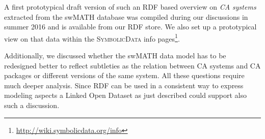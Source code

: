\documentclass{mathincs}
\newcommand{\SD}{\textsc{Symbo\-lic\-Data}}
\begin{document}
A first prototypical draft version of such an RDF based overview on \emph{CA
  systems} extracted from the swMATH database was compiled during our
discussions in summer 2016 and is available from our RDF store.  We also set up
a prototypical view on that data within the {\SD} info pages\footnote{
  \url{http://wiki.symbolicdata.org/info}}.

Additionally, we discussed whether the swMATH data model has to be redesigned
better to reflect subtleties as the relation between CA systems and CA
packages or different versions of the same system.  All these questions
require much deeper analysis.  Since RDF can be used in a consistent way to
express modeling aspects a Linked Open Dataset as just described could support
also such a discussion.

\raggedright
\end{document}
